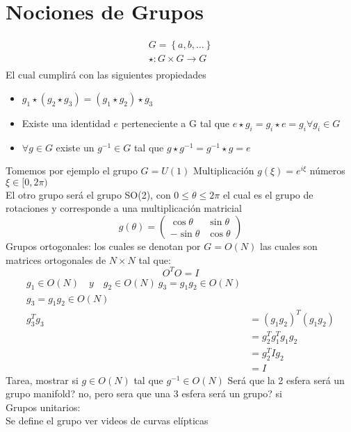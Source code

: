 \documentclass[../main.tex]{subfiles}
\begin{document}
\section{Nociones de Grupos}
\begin{align*}
  G=\left\{a,b,\dots\right\} \\
  \star : G \times G \rightarrow G \\
\end{align*}
El cual cumplirá con las siguientes propiedades 
\begin{itemize}
  \item $g_1 \star (g_2 \star g_3) = (g_1\star g_2)\star g_3$ 
  \item Existe una identidad $e$ perteneciente a G tal que $e\star g_i = g_i \star e = g_i \forall g_i \in G$
  \item $\forall g \in G$ existe un $g^{-1}\in G$ tal que $g\star g^{-1} = g^{-1}\star g = e$ 
\end{itemize}
Tomemos por ejemplo el grupo $G=U(1)$
Multiplicación $g(\xi)= e^{i\xi}$ números $\xi \in [0,2\pi)$ \\
El otro grupo será el grupo SO(2), con $0\leq\theta\leq 2\pi$ el cual es el grupo de rotaciones y corresponde a una multiplicación matricial
\begin{equation} g(\theta)=
  \begin{pmatrix}
    \cos{\theta} & \sin{\theta} \\
    -\sin{\theta} & \cos{\theta}
  \end{pmatrix}
\end{equation}
Grupos ortogonales: los cuales se denotan por $G=O(N)$ las cuales son matrices ortogonales de $N\times N$ tal que: 
\begin{equation}
  O^TO=I
\end{equation}
\begin{align*}
  g_1\in O(N) \quad y \quad g_2\in O(N) \
  g_3 = g_1g_2 \in O(N) \\
  g_3 = g_1g_2 \in O(N) \\
  g^T_3 g_3 &  = (g_1g_2)^T (g_1g_2)  \\
  & = g_2^Tg_1^Tg_1g_2 \\
  & = g_2^TIg_2 \\
  & = I
\end{align*}
Tarea, mostrar si $g\in O(N) $ tal que $g^{-1}\in O(N)$ 
Será que la 2 esfera será un grupo manifold? no, pero sera que una 3 esfera será un grupo? si \\
Grupos unitarios: \\
Se define el grupo
ver videos de curvas elípticas
\end{document}
